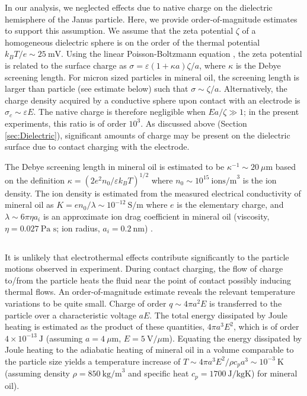 \begin{appendices}
In our analysis, we neglected effects due to native charge on the dielectric hemisphere of the Janus particle.
Here, we provide order-of-magnitude estimates to support this assumption.
We assume that the zeta potential $\zeta$ of a homogeneous dielectric sphere is on the order of the thermal potential $k_BT/e\sim25~\text{mV}$. 
Using the linear Poisson-Boltzmann equation \cite{Berg2014}, the zeta potential is related to the surface charge as $\sigma=\varepsilon(1+\kappa a)\zeta/a$, where $\kappa$ is the Debye screening length. 
For micron sized particles in mineral oil, the screening length is larger than particle (see estimate below) such that $\sigma\sim \zeta/a$. Alternatively, the charge density acquired by a conductive sphere upon contact with an electrode is $\sigma_c\sim \varepsilon E$. 
The native charge is therefore negligible when $Ea/\zeta \gg 1$; in the present experiments, this ratio is of order $10^3$.
As discussed above (Section \ref{sec:Dielectric}), significant amounts of charge may be present on the dielectric surface due to contact charging with the electrode.

The Debye screening length in mineral oil is estimated to be $\kappa^{-1}\sim 20~\mu\text{m}$ based on the definition $\kappa = (2e^2 n_0/\varepsilon k_B T)^{1/2}$ where $n_0\sim10^{15}~\text{ions/m}^3$ is the ion density. 
The ion density is estimated from the measured electrical conductivity of mineral oil as $K = e n_0 / \lambda\sim 10^{-12}~\text{S/m}$ where $e$ is the elementary charge, and $\lambda\sim6\pi\eta a_i$ is an approximate ion drag coefficient in mineral oil (viscosity, $\eta = 0.027~\text{Pa s}$; ion radius, $a_i = 0.2~\text{nm}$) \cite{Cartier2014}.  


\subsection{}

It is unlikely that electrothermal effects contribute significantly to the particle motions observed in experiment.
During contact charging, the flow of charge to/from the particle heats the fluid near the point of contact possibly inducing thermal flows. 
An order-of-magnitude estimate reveals the relevant temperature variations to be quite small.  
Charge of order $q\sim4\pi a^2 E$ is transferred to the particle over a characteristic voltage $aE$. 
The total energy dissipated by Joule heating is estimated as the product of these quantities, $4\pi a^3 E^2$, which is of order $4\times10^{-13}~\text{J}$ (assuming $a = 4~\mu\text{m}$, $E = 5~\text{V/}\mu\text{m}$).  
Equating the energy dissipated by Joule heating to the adiabatic heating of mineral oil in a volume comparable to the particle size yields a temperature increase of $T\sim4\pi a^3E^2/\rho c_p a^3\sim 10^{-3}~\text{K}$ (assuming density $\rho = 850~\text{kg/m}^3$ and specific heat $c_p = 1700~\text{J/kgK}$) for mineral oil).







\end{appendices}
